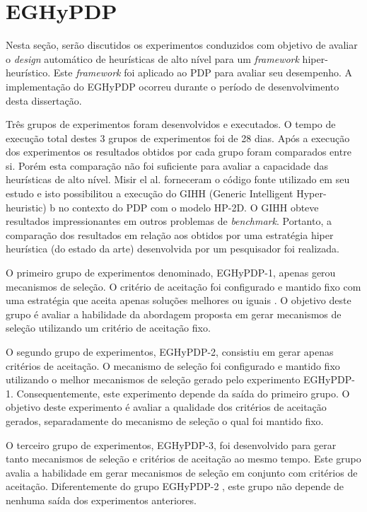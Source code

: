 \section{EGHyPDP}

Nesta seção, serão discutidos  os experimentos conduzidos com objetivo de avaliar o \textit{design} automático de heurísticas de alto nível para um \textit{framework} hiper-heurístico. Este \textit{framework} foi aplicado ao PDP para avaliar seu desempenho. A implementação do EGHyPDP ocorreu durante o período de desenvolvimento desta dissertação. 


Três grupos de experimentos foram desenvolvidos e executados. O tempo de execução total destes 3 grupos de experimentos foi de 28 dias. Após a execução dos experimentos os resultados obtidos por cada grupo foram comparados entre si. Porém esta comparação não foi suficiente para avaliar a capacidade das heurísticas de alto nível. Misir el al. forneceram o código fonte utilizado em seu estudo e isto possibilitou a execução do GIHH (Generic Intelligent Hyper-heuristic) \cite{misir2012intelligent}b no contexto do PDP com o modelo HP-2D. O GIHH obteve resultados impressionantes em outros problemas de \textit{benchmark}. Portanto, a comparação dos resultados em relação aos obtidos por uma estratégia hiper heurística (do estado da arte) desenvolvida por um pesquisador foi realizada. 

O primeiro grupo de experimentos denominado, EGHyPDP-1, apenas gerou mecanismos de seleção. O critério de aceitação foi configurado e mantido fixo com uma estratégia que aceita apenas soluções melhores ou iguais \cite{burke2013hyper}. O objetivo deste grupo é avaliar a habilidade da abordagem proposta em gerar mecanismos de seleção utilizando um critério de aceitação fixo.

	O segundo grupo de experimentos, EGHyPDP-2, consistiu em gerar apenas critérios de aceitação. O mecanismo de seleção foi configurado e mantido fixo utilizando o melhor mecanismos de seleção gerado pelo experimento EGHyPDP-1. Consequentemente, este experimento depende da saída do primeiro grupo. O objetivo deste experimento é avaliar a qualidade dos critérios de aceitação gerados, separadamente do mecanismo de seleção o qual foi mantido fixo.
	
	O terceiro grupo de experimentos,  EGHyPDP-3, foi desenvolvido para gerar tanto mecanismos de seleção e critérios de aceitação ao mesmo tempo. Este grupo avalia a habilidade em gerar mecanismos de seleção em conjunto com critérios de aceitação. Diferentemente do grupo EGHyPDP-2  , este grupo não depende de nenhuma saída dos experimentos anteriores.


